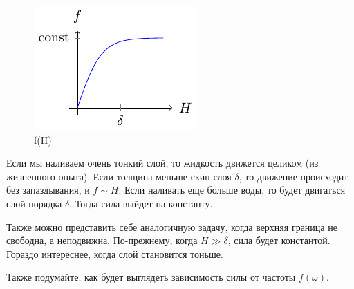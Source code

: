 \begin{figure}[tb]
    \centering
    \includegraphics[scale=1.5]{img/fH}
    \caption{f(H)}
    \label{fig:figure1}
\end{figure}

Если мы наливаем очень тонкий слой, то жидкость движется целиком (из жизненного опыта). Если толщина меньше скин-слоя $\delta$, то движение происходит без запаздывания, и $f \sim H$. Если наливать еще больше воды, то будет двигаться слой порядка $\delta$. Тогда сила выйдет на константу.

Также можно представить себе аналогичную задачу, когда верхняя граница не свободна, а неподвижна. По-прежнему, когда $H \gg \delta$, сила будет константой. Гораздо интереснее, когда слой становится тоньше.

Также подумайте, как будет выглядеть зависимость силы от частоты $f(\omega)$.


